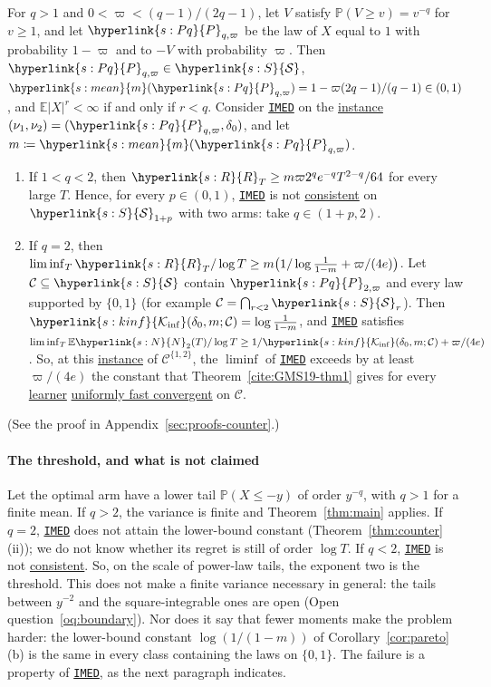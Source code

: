 \documentclass[11pt]{article}
\newcommand{\E}{\mathbb{E}}
\newcommand{\Prob}{\mathbb{P}}
\newcommand{\dt}[1]{\hypertarget{#1}{}}
\newcommand{\sy}[2]{{\hyperlink{#1}{#2}}}
\newcommand{\term}[2]{\hyperlink{#1}{#2}}
\newcommand{\imed}{\hyperref[alg:imed]{\texttt{IMED}}}
\newcommand{\Sm}{\sy{s:S}{\mathcal{S}}}
\newcommand{\mean}{\sy{s:mean}{m}}
\newcommand{\Kinf}{\sy{s:kinf}{\mathcal{K}_{\inf}}}
\newcommand{\Np}{\sy{s:N}{N}}
\newcommand{\Reg}{\sy{s:R}{R}}
\newcommand{\Pq}{\sy{s:Pq}{P}}
\begin{document}
\begin{corollary}\label{cor:pareto}
For $q>1$ and $0<\varpi<(q-1)/(2q-1)$, let $V$ satisfy $\Prob(V\ge v)=v^{-q}$ for $v\ge1$, and let
\dt{s:Pq}$\Pq_{q,\varpi}$ be the law of $X$ equal to $1$ with probability $1-\varpi$ and to $-V$ with probability
$\varpi$. Then $\Pq_{q,\varpi}\in\Sm$, $\mean(\Pq_{q,\varpi})=1-\varpi(2q-1)/(q-1)\in(0,1)$, and $\E|X|^r<\infty$ if and
only if $r<q$. Consider \imed{} on the \term{w:instance}{instance} $(\nu_1,\nu_2)=(\Pq_{q,\varpi},\delta_0)$, and let
$m\coloneqq \mean(\Pq_{q,\varpi})$.
\begin{enumerate}[label=(\alph*)]
\item If $1<q<2$, then $\Reg_T\ge m\varpi2^qe^{-q}T^{2-q}/64$ for every large $T$. Hence, for every
  $p\in(0,1)$, \imed{} is not \term{w:consistent}{consistent} on $\Sm_{1+p}$ with two arms: take $q\in(1+p,2)$.
\item If $q=2$, then $\liminf_T\Reg_T/\log T\ge m\big(1/\log\frac1{1-m}+\varpi/(4e)\big)$. Let
  $\mathcal C\subseteq\Sm$ contain $\Pq_{2,\varpi}$ and every law supported by $\{0,1\}$ (for example
  $\mathcal C=\bigcap_{r<2}\Sm_r$). Then $\Kinf(\delta_0,m;\mathcal C)=\log\frac{1}{1-m}$, and \imed{}
  satisfies $\liminf_T\E \Np_2(T)/\log T\ge1/\Kinf(\delta_0,m;\mathcal C)+\varpi/(4e)$. So, at this
  \term{w:instance}{instance} of $\mathcal C^{\{1,2\}}$, the $\liminf$ of \imed{} exceeds by at least $\varpi/(4e)$ the
  constant that Theorem~\ref{cite:GMS19-thm1} gives for every \term{w:learner}{learner} \term{w:ufc}{uniformly fast convergent} on
  $\mathcal C$.
\end{enumerate}
\end{corollary}

(See the proof in Appendix~\ref{sec:proofs-counter}.)

\paragraph{The threshold, and what is not claimed} Let the optimal arm have a lower tail
$\Prob(X\le-y)$ of order $y^{-q}$, with $q>1$ for a finite mean. If $q>2$, the variance is finite and
Theorem~\ref{thm:main} applies. If $q=2$, \imed{} does not attain the lower-bound constant
(Theorem~\ref{thm:counter}(ii)); we do not know whether its regret is still of order $\log T$. If
$q<2$, \imed{} is not \term{w:consistent}{consistent}. So, on the scale of power-law tails, the exponent two is the
threshold. This does not make a finite variance necessary in general: the tails between $y^{-2}$ and
the square-integrable ones are open (Open question~\ref{oq:boundary}). Nor does it say that fewer
moments make the problem harder: the lower-bound constant $\log(1/(1-m))$ of
Corollary~\ref{cor:pareto}(b) is the same in every class containing the laws on $\{0,1\}$. The
failure is a property of \imed{}, as the next paragraph indicates.
\end{document}
